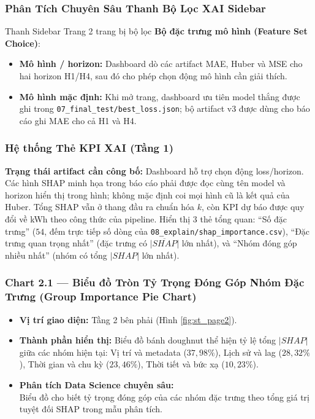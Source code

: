 \documentclass[12pt,a4paper]{article}
\begin{document}
\subsubsection{Phân Tích Chuyên Sâu Thanh Bộ Lọc XAI Sidebar}
Thanh Sidebar Trang 2 trang bị bộ lọc \textbf{Bộ đặc trưng mô hình (Feature Set Choice)}:
\begin{itemize}
    \item \textbf{Mô hình / horizon:} Dashboard dò các artifact MAE, Huber và MSE cho hai horizon H1/H4, sau đó cho phép chọn động mô hình cần giải thích.
    \item \textbf{Mô hình mặc định:} Khi mở trang, dashboard ưu tiên model thắng được ghi trong \texttt{07\_final\_test/best\_loss.json}; bộ artifact v3 được dùng cho báo cáo ghi MAE cho cả H1 và H4.
\end{itemize}

\subsubsection{Hệ thống Thẻ KPI XAI (Tầng 1)}
\textbf{Trạng thái artifact cần công bố:} Dashboard hỗ trợ chọn động loss/horizon. Các hình SHAP minh họa trong báo cáo phải được đọc cùng tên model và horizon hiển thị trong hình; không mặc định coi mọi hình cũ là kết quả của Huber. Tổng SHAP vẫn ở thang đầu ra chuẩn hóa $k$, còn KPI dự báo được quy đổi về kWh theo công thức của pipeline.
Hiển thị 3 thẻ tổng quan: ``Số đặc trưng'' ($54$, đếm trực tiếp số dòng của \texttt{08\_explain/shap\_importance.csv}), ``Đặc trưng quan trọng nhất'' (đặc trưng có $\overline{|SHAP|}$ lớn nhất), và ``Nhóm đóng góp nhiều nhất'' (nhóm có tổng $|SHAP|$ lớn nhất).

\subsubsection{Chart 2.1 — Biểu đồ Tròn Tỷ Trọng Đóng Góp Nhóm Đặc Trưng (Group Importance Pie Chart)}
\begin{itemize}
    \item \textbf{Vị trí giao diện:} Tầng 2 bên phải (Hình \ref{fig:st_page2}).
    \item \textbf{Thành phần hiển thị:} Biểu đồ bánh doughnut thể hiện tỷ lệ tổng $|SHAP|$ giữa các nhóm hiện tại: Vị trí và metadata ($37{,}98\%$), Lịch sử và lag ($28{,}32\%$), Thời gian và chu kỳ ($23{,}46\%$), Thời tiết và bức xạ ($10{,}23\%$).
    \item \textbf{Phân tích Data Science chuyên sâu:}\\ 
    Biểu đồ cho biết tỷ trọng đóng góp của các nhóm đặc trưng theo tổng giá trị tuyệt đối SHAP trong mẫu phân tích.
\end{itemize}
\end{document}
